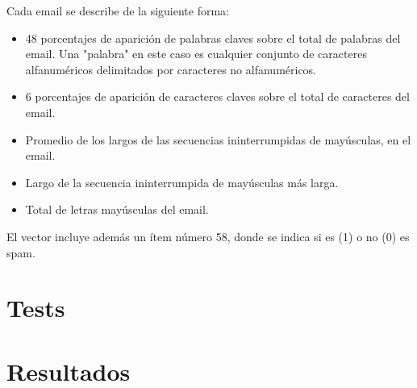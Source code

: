\documentclass[letterpaper,11pt]{article} %
\begin{document}
Cada email se describe de la siguiente forma:
\begin{itemize}
\item 48 porcentajes de aparición de palabras claves sobre el total de palabras del email. Una "palabra" en este caso es cualquier conjunto de caracteres alfanuméricos delimitados por caracteres no alfanuméricos.
\item 6 porcentajes de aparición de caracteres claves sobre el total de caracteres del email.
\item Promedio de los largos de las secuencias ininterrumpidas de mayúsculas, en el email.
\item Largo de la secuencia ininterrumpida de mayúsculas más larga.
\item Total de letras mayúsculas del email.

\end{itemize}
El vector incluye además un ítem número 58, donde se indica si es (1) o no (0) es spam.

\section{Tests}
\section{Resultados}


\end{document}
